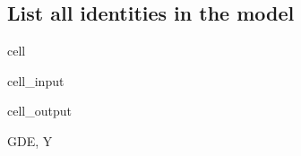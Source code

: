 \documentclass[letterpaper,10pt,english]{jupyterBook}
\begin{document}
\subsection{List all identities in the model}
\label{\detokenize{content/05_SimpleModel/SimpleModel:list-all-identities-in-the-model}}
\begin{sphinxuseclass}{cell}\begin{sphinxVerbatimInput}

\begin{sphinxuseclass}{cell_input}
\begin{sphinxVerbatim}[commandchars=\\\{\}]
        \PYG{p}{[}\PYG{p}{]}\PYG{p}{[}\PYG{p}{]}   
\end{sphinxVerbatim}

\end{sphinxuseclass}\end{sphinxVerbatimInput}
\begin{sphinxVerbatimOutput}

\begin{sphinxuseclass}{cell_output}
\begin{sphinxVerbatim}[commandchars=\\\{\}]
\PYGZob{}\PYGZsq{}GDE\PYGZsq{}, \PYGZsq{}Y\PYGZsq{}\PYGZcb{}
\end{sphinxVerbatim}

\end{sphinxuseclass}\end{sphinxVerbatimOutput}

\end{sphinxuseclass}
\end{document}
